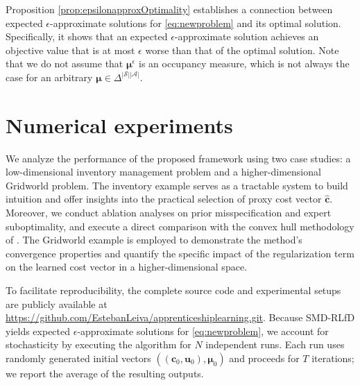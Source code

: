 \documentclass[10pt]{article} %
\def\Ac{\ensuremath{\mathcal{A}}}
\def\vc{{\bm{c}}}
\def\vu{{\bm{u}}}
\def\vmu{{\bm{\mu}}}
\newcommand{\St}{\mathcal{S}}
\begin{document}
Proposition \ref{prop:epsilonapproxOptimality} establishes a connection between expected $\epsilon$-approximate solutions for \eqref{eq:newproblem} and its optimal solution. Specifically, it shows that an expected $\epsilon$-approximate solution achieves an objective value that is at most $\epsilon$ worse than that of the optimal solution. Note that we do not assume that $\vmu^\epsilon$ is an occupancy measure, which is not always the case for an arbitrary $\vmu\in\Delta^{|\St||\Ac|}$.

\section{Numerical experiments}

We analyze the performance of the proposed framework using two case studies: a low-dimensional inventory management problem and a higher-dimensional Gridworld problem. The inventory example serves as a tractable system to build intuition and offer insights into the practical selection of proxy cost vector $\hat{\vc}$. Moreover, we conduct ablation analyses on prior misspecification and expert suboptimality, and execute a direct comparison with the convex hull methodology of \cite{Kamoutsi2021}. The Gridworld example is employed to demonstrate the method's convergence properties and quantify the specific impact of the regularization term on the learned cost vector in a higher-dimensional space.

To facilitate reproducibility, the complete source code and experimental setups are publicly available at \url{https://github.com/EstebanLeiva/apprenticeshiplearning.git}. Because SMD-RLfD yields expected $\epsilon$-approximate solutions for \eqref{eq:newproblem}, we account for stochasticity by executing the algorithm for $N$ independent runs. Each run uses randomly generated initial vectors $((\vc_0, \vu_0), \vmu_0)$ and proceeds for $T$ iterations; we report the average of the resulting outputs. 
\end{document}
